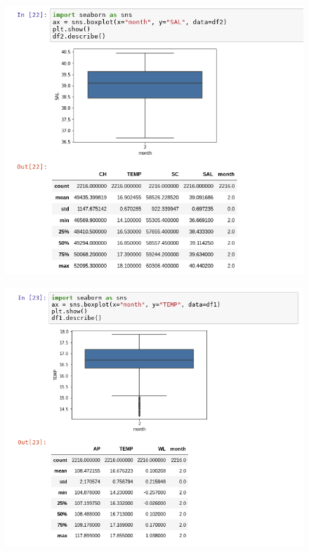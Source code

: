 \documentclass{article}
\begin{document}
\begin{figure}[H]
	\centering
    \includegraphics[width=\linewidth]{caja2.png}\\
\end{figure}
\begin{figure}[H]
	\centering
    \includegraphics[width=\linewidth]{caja3.png}\\
\end{figure}
\end{document}
